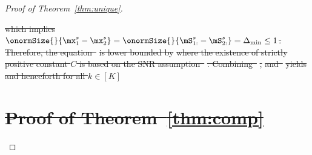 \documentclass[lettersize,onecolumn,journal]{IEEEtran}
\theoremstyle{definition}
\theoremstyle{definition}
\newcommand{\ang}[1]{\left\langle#1\right\rangle}
\providecommand{\DIFdeltex}[1]{{\protect\color{red}\sout{#1}}}                      %
\providecommand{\DIFdel}[1]{\texorpdfstring{\DIFdeltex{#1}}{}} %
\begin{document}
\begin{proof}[Proof of Theorem~\ref{thm:unique}]
\begin{enumerate}[wide]
\DIFdel{which implies $\onormSize{}{\mx^s_1-\mx^s_2} = \onormSize{}{\mS_{1:}^s-\mS_{2:}^s} = \Delta_{\min} \leq 1$. Therefore, the equation~}%
\DIFdel{is lower bounded by
}%
\DIFdel{where the existence of strictly positive constant $C$ is based on the SNR assumption~}%
\DIFdel{. Combining~}%
\DIFdel{, }%
\DIFdel{and~}%
\DIFdel{yields
}%
\DIFdel{and henceforth for all $k \in [K]$
}%


\section*{\DIFdel{Proof of Theorem~\ref{thm:comp}}}


\end{enumerate}
\end{proof}
\end{document}
